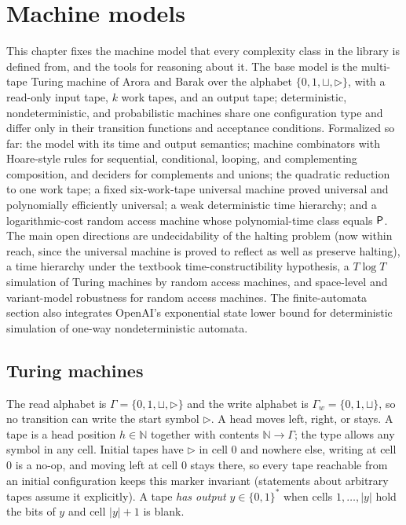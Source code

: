 \chapter{Machine models}
\label{chap:models}

This chapter fixes the machine model that every complexity class in the library
is defined from, and the tools for reasoning about it. The base model is the
multi-tape Turing machine of Arora and Barak over the alphabet
$\{0, 1, \sqcup, \triangleright\}$, with a read-only input tape, $k$ work tapes,
and an output tape; deterministic, nondeterministic, and probabilistic machines
share one configuration type and differ only in their transition functions and
acceptance conditions. Formalized so far: the model with its time and output
semantics; machine combinators with Hoare-style rules for sequential,
conditional, looping, and complementing composition, and deciders for
complements and unions; the quadratic reduction to one work tape; a fixed
six-work-tape universal machine proved universal and polynomially efficiently
universal; a weak deterministic time hierarchy; and a logarithmic-cost random
access machine whose polynomial-time class equals $\mathsf{P}$. The main open
directions are undecidability of the halting problem (now within reach, since
the universal machine is proved to reflect as well as preserve halting), a time
hierarchy under the textbook time-constructibility hypothesis, a
$T \log T$ simulation of Turing machines by random access machines, and
space-level and variant-model robustness for random access machines.
The finite-automata section also integrates OpenAI's exponential state lower
bound for deterministic simulation of one-way nondeterministic automata.

\section{Turing machines}

\begin{definition}
  \label{def:models-tape}
  \leanok
  The read alphabet is $\Gamma = \{0, 1, \sqcup, \triangleright\}$ and the write
  alphabet is $\Gamma_w = \{0, 1, \sqcup\}$, so no transition can write the
  start symbol $\triangleright$. A head moves left, right, or stays. A tape is a
  head position $h \in \mathbb{N}$ together with contents
  $\mathbb{N} \to \Gamma$; the type allows any symbol in any cell. Initial
  tapes have $\triangleright$ in cell $0$ and nowhere else, writing at cell $0$
  is a no-op, and moving left at cell $0$ stays there, so every tape reachable
  from an initial configuration keeps this marker invariant (statements about
  arbitrary tapes assume it explicitly). A tape \emph{has output}
  $y \in \{0,1\}^*$ when cells $1, \dots, |y|$ hold the bits of $y$ and cell
  $|y| + 1$ is blank.
\end{definition}

